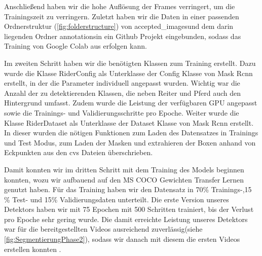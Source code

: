 Anschließend haben wir die hohe Auflösung der Frames verringert, um die Trainingszeit zu verringern. Zuletzt haben wir die Daten in einer passenden Ordnerstruktur (\ref{fig:folderstructure}) von \dq accepted_images\dq und dem darin liegenden Ordner \dq annotations\dq in ein Github Projekt eingebunden, sodass das Training von Google Colab aus erfolgen kann.

Im zweiten Schritt haben wir die benötigten Klassen zum Training erstellt. Dazu wurde die Klasse RiderConfig als Unterklasse der Config Klasse von Mask Rcnn erstellt, in der die Parameter individuell angepasst wurden. Wichtig war die Anzahl der zu detektierenden Klassen, die neben Reiter und Pferd auch den Hintergrund umfasst. Zudem wurde die Leistung der verfügbaren GPU angepasst sowie die Trainings- und Validierungsschritte pro Epoche. 
Weiter wurde die Klasse RiderDataset als Unterklasse der Dataset Klasse von Mask Rcnn erstellt. In dieser wurden die nötigen Funktionen zum Laden des Datensatzes in Trainings und Test Modus, zum Laden der Masken und extrahieren der Boxen anhand von Eckpunkten aus den cvs Dateien überschrieben.

Damit konnten wir im dritten Schritt mit dem Training des Models beginnen konnten, wozu wir aufbauend auf den MS COCO Gewichten Transfer Lernen genutzt haben. Für das Training haben wir den Datensatz in 70\% Trainings-,15 \% Test- und 15\% Validierungsdaten unterteilt. Die erste Version unseres Detektors haben wir mit 75 Epochen mit 500 Schritten trainiert, bis der Verlust pro Epoche sehr gering wurde. Die damit erreichte Leistung unseres Detektors war für die bereitgestellten Videos ausreichend zuverlässig(siehe \ref{fig:SegmentierungPhase2}), sodass wir danach mit diesem die ersten Videos erstellen konnten  .

